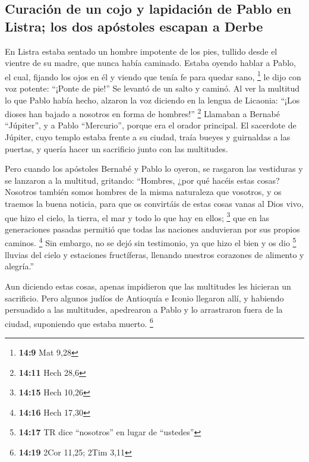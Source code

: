 \begin{paracol}{2}
\hypertarget{curaciuxf3n-de-un-cojo-y-lapidaciuxf3n-de-pablo-en-listra-los-dos-apuxf3stoles-escapan-a-derbe}{%
\subsection{Curación de un cojo y lapidación de Pablo en Listra; los dos
apóstoles escapan a
Derbe}\label{curaciuxf3n-de-un-cojo-y-lapidaciuxf3n-de-pablo-en-listra-los-dos-apuxf3stoles-escapan-a-derbe}}

 En Listra estaba sentado un hombre impotente de los pies,
tullido desde el vientre de su madre, que nunca había caminado.
 Estaba oyendo hablar a Pablo, el cual, fijando los ojos
en él y viendo que tenía fe para quedar sano, \footnote{\textbf{14:9}
  Mat 9,28}  le dijo con voz potente: ``¡Ponte de pie!''
Se levantó de un salto y caminó.  Al ver la multitud lo
que Pablo había hecho, alzaron la voz diciendo en la lengua de Licaonia:
``¡Los dioses han bajado a nosotros en forma de hombres!'' \footnote{\textbf{14:11}
  Hech 28,6}  Llamaban a Bernabé ``Júpiter'', y a Pablo
``Mercurio'', porque era el orador principal.  El
sacerdote de Júpiter, cuyo templo estaba frente a su ciudad, traía
bueyes y guirnaldas a las puertas, y quería hacer un sacrificio junto
con las multitudes.

 Pero cuando los apóstoles Bernabé y Pablo lo oyeron, se
rasgaron las vestiduras y se lanzaron a la multitud, gritando:
 ``Hombres, ¿por qué hacéis estas cosas? Nosotros también
somos hombres de la misma naturaleza que vosotros, y os traemos la buena
noticia, para que os convirtáis de estas cosas vanas al Dios vivo, que
hizo el cielo, la tierra, el mar y todo lo que hay en ellos; \footnote{\textbf{14:15}
  Hech 10,26}  que en las generaciones pasadas permitió
que todas las naciones anduvieran por sus propios caminos. \footnote{\textbf{14:16}
  Hech 17,30}  Sin embargo, no se dejó sin testimonio, ya
que hizo el bien y os dio \footnote{\textbf{14:17} TR dice ``nosotros''
  en lugar de ``ustedes''} lluvias del cielo y estaciones fructíferas,
llenando nuestros corazones de alimento y alegría.''

 Aun diciendo estas cosas, apenas impidieron que las
multitudes les hicieran un sacrificio.  Pero algunos
judíos de Antioquía e Iconio llegaron allí, y habiendo persuadido a las
multitudes, apedrearon a Pablo y lo arrastraron fuera de la ciudad,
suponiendo que estaba muerto. \footnote{\textbf{14:19} 2Cor 11,25; 2Tim
  3,11}


\end{paracol}
